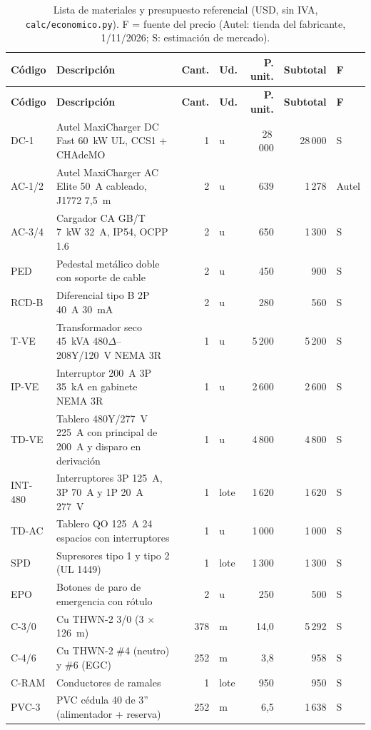 {\small
\begin{longtable}{L{1.4cm}L{7.4cm}rL{0.8cm}rrL{0.9cm}}
\caption{Lista de materiales y presupuesto referencial (USD, sin IVA, \texttt{calc/economico.py}). F = fuente del precio (Autel: tienda del fabricante, 1/11/2026; S: estimación de mercado).}\label{tab:bom}\\
\toprule
\textbf{Código} & \textbf{Descripción} & \textbf{Cant.} & \textbf{Ud.} & \textbf{P. unit.} & \textbf{Subtotal} & \textbf{F}\\
\midrule\endfirsthead
\toprule
\textbf{Código} & \textbf{Descripción} & \textbf{Cant.} & \textbf{Ud.} & \textbf{P. unit.} & \textbf{Subtotal} & \textbf{F}\\
\midrule\endhead
DC-1 & Autel MaxiCharger DC Fast 60~kW UL, CCS1 + CHAdeMO & 1 & u & 28\,000 & 28\,000 & S\\
AC-1/2 & Autel MaxiCharger AC Elite 50~A cableado, J1772 7,5~m & 2 & u & 639 & 1\,278 & Autel\\
AC-3/4 & Cargador CA GB/T 7~kW 32~A, IP54, OCPP 1.6 & 2 & u & 650 & 1\,300 & S\\
PED & Pedestal metálico doble con soporte de cable & 2 & u & 450 & 900 & S\\
RCD-B & Diferencial tipo B 2P 40~A 30~mA & 2 & u & 280 & 560 & S\\
T-VE & Transformador seco 45~kVA 480$\Delta$--208Y/120~V NEMA 3R & 1 & u & 5\,200 & 5\,200 & S\\
IP-VE & Interruptor 200~A 3P 35~kA en gabinete NEMA 3R & 1 & u & 2\,600 & 2\,600 & S\\
TD-VE & Tablero 480Y/277~V 225~A con principal de 200~A y disparo en derivación & 1 & u & 4\,800 & 4\,800 & S\\
INT-480 & Interruptores 3P 125~A, 3P 70~A y 1P 20~A 277~V & 1 & lote & 1\,620 & 1\,620 & S\\
TD-AC & Tablero QO 125~A 24 espacios con interruptores & 1 & u & 1\,000 & 1\,000 & S\\
SPD & Supresores tipo 1 y tipo 2 (UL 1449) & 1 & lote & 1\,300 & 1\,300 & S\\
EPO & Botones de paro de emergencia con rótulo & 2 & u & 250 & 500 & S\\
C-3/0 & Cu THWN-2 3/0 (3 $\times$ 126~m) & 378 & m & 14,0 & 5\,292 & S\\
C-4/6 & Cu THWN-2 \#4 (neutro) y \#6 (EGC) & 252 & m & 3,8 & 958 & S\\
C-RAM & Conductores de ramales & 1 & lote & 950 & 950 & S\\
PVC-3 & PVC cédula 40 de 3'' (alimentador + reserva) & 252 & m & 6,5 & 1\,638 & S\\

\end{longtable}}
